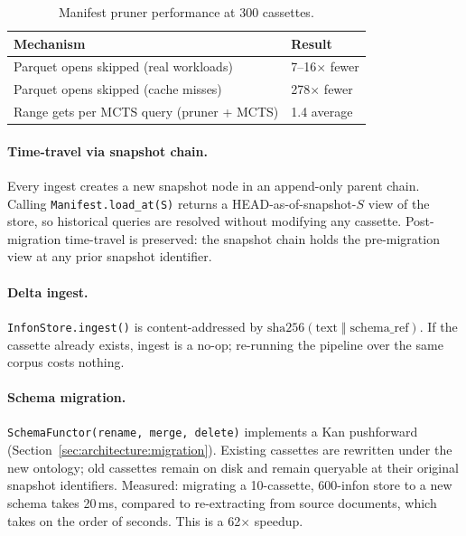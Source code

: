 \begin{table}[ht]
  \centering
  \caption{Manifest pruner performance at 300 cassettes.}
  \label{tab:pruner}
  \begin{tabular}{ll}
    \toprule
    Mechanism & Result \\
    \midrule
    Parquet opens skipped (real workloads) & 7--16$\times$ fewer \\
    Parquet opens skipped (cache misses)   & 278$\times$ fewer \\
    Range gets per MCTS query (pruner + MCTS) & 1.4 average \\
    \bottomrule
  \end{tabular}
\end{table}

\paragraph{Time-travel via snapshot chain.}
Every ingest creates a new snapshot node in an append-only parent chain.
Calling \texttt{Manifest.load\_at(S)} returns a HEAD-as-of-snapshot-$S$ view
of the store, so historical queries are resolved without modifying any
cassette.  Post-migration time-travel is preserved: the snapshot chain holds
the pre-migration view at any prior snapshot identifier.

\paragraph{Delta ingest.}
\texttt{InfonStore.ingest()} is content-addressed by
$\mathrm{sha256}(\text{text} \;\Vert\; \text{schema\_ref})$.  If the cassette
already exists, ingest is a no-op; re-running the pipeline over the same
corpus costs nothing.

\paragraph{Schema migration.}
\texttt{SchemaFunctor(rename, merge, delete)} implements a Kan pushforward
(Section~\ref{sec:architecture:migration}).  Existing cassettes are rewritten
under the new ontology; old cassettes remain on disk and remain queryable at
their original snapshot identifiers.  Measured: migrating a 10-cassette,
600-infon store to a new schema takes 20\,ms, compared to re-extracting from
source documents, which takes on the order of seconds.  This is a 62$\times$
speedup.

